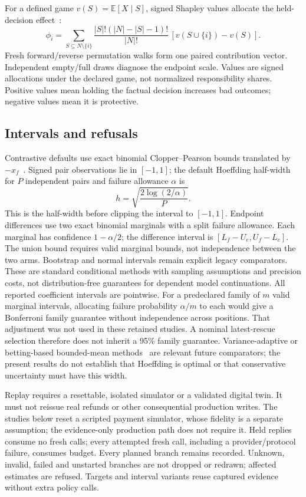 \documentclass[conference]{IEEEtran}
\begin{document}
For a defined game $v(S)=\mathbb{E}[X\mid S]$, signed Shapley values allocate
the held-decision effect~\cite{shapley}:
\begin{equation}
\phi_i = \sum_{S\subseteq N\setminus\{i\}}
\frac{|S|!(|N|-|S|-1)!}{|N|!}\,[v(S\cup\{i\})-v(S)].
\end{equation}
Fresh forward/reverse permutation walks form one paired contribution vector.
Independent empty/full draws diagnose the endpoint scale. Values are signed
allocations under the declared game, not normalized responsibility shares.
Positive values mean holding the factual decision increases bad outcomes;
negative values mean it is protective.

\subsection{Intervals and refusals}
Contrastive defaults use exact binomial Clopper--Pearson bounds translated by
$-x_f$~\cite{clopperpearson}. Signed pair observations lie in $[-1,1]$; the default
Hoeffding half-width for $P$ independent pairs and failure allowance $\alpha$
is~\cite{hoeffding}
\begin{equation}
h=\sqrt{\frac{2\log(2/\alpha)}{P}}.
\end{equation}
This is the half-width before clipping the interval to $[-1,1]$.
Endpoint differences use two exact binomial marginals with a split failure
allowance. Each marginal has confidence $1-\alpha/2$; the difference interval
is $[L_f-U_e,U_f-L_e]$. The union bound requires valid marginal bounds, not
independence between the two arms. Bootstrap and normal intervals remain
explicit legacy comparators.
These are standard conditional methods with sampling assumptions and precision
costs, not distribution-free guarantees for dependent model continuations.
All reported coefficient intervals are pointwise. For a predeclared family
of $m$ valid marginal intervals, allocating failure probability $\alpha/m$ to
each would give a Bonferroni family guarantee without independence across
positions. That adjustment was not used in these retained studies. A nominal
latest-rescue selection therefore does not inherit a 95\% family guarantee.
Variance-adaptive or betting-based bounded-mean methods~\cite{betting} are
relevant future comparators; the present results do not establish that
Hoeffding is optimal or that conservative uncertainty must have this width.

Replay requires a resettable, isolated simulator or a validated digital twin.
It must not reissue real refunds or other consequential production writes.
The studies below reset a scripted payment simulator, whose fidelity is a
separate assumption; the evidence-only production path does not require it.
Held replies consume no fresh calls;
every attempted fresh call, including a provider/protocol failure, consumes
budget. Every planned branch remains recorded. Unknown, invalid, failed and
unstarted branches are not dropped or redrawn; affected estimates are refused.
Targets and interval variants reuse captured evidence without extra policy calls.
\end{document}
